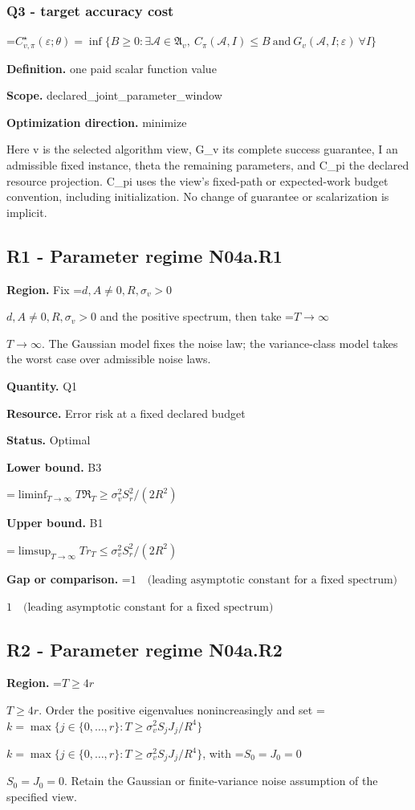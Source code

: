 \documentclass[10pt,a4paper]{article}
\newcommand{\AtlasMath}[1]{\par\begingroup\centering\setbox0=\hbox{$\displaystyle #1$}\ifdim\wd0>1.4\linewidth\typeout{ATLAS WIDE FORMULA: \the\wd0}\fi\ifdim\wd0>\linewidth\resizebox{\linewidth}{!}{\box0}\else\box0\fi\par\endgroup}
\newcommand{\AtlasInlineMath}[1]{\begingroup\setbox0=\hbox{$#1$}\ifdim\wd0>.4\linewidth\endgroup\AtlasMath{#1}\else\endgroup$#1$\fi}
\begin{document}
\subsubsection{Q3 - target accuracy cost}
\AtlasMath{C^\star_{v,\pi}(\varepsilon;\theta)=\inf\{B\ge0:\exists\mathcal A\in\mathfrak A_v,\ C_\pi(\mathcal A,I)\le B\ \text{and}\ G_v(\mathcal A,I;\varepsilon)\ \forall I\}}
\textbf{Definition.} one paid scalar function value

\textbf{Scope.} declared\_joint\_parameter\_window

\textbf{Optimization direction.} minimize

Here v is the selected algorithm view, G\_v its complete success guarantee, I an admissible fixed instance, theta the remaining parameters, and C\_pi the declared resource projection. C\_pi uses the view's fixed-path or expected-work budget convention, including initialization. No change of guarantee or scalarization is implicit.

\subsection{R1 - Parameter regime N04a.R1}
\textbf{Region.} Fix \AtlasInlineMath{d,A\ne0,R,\sigma_v>0} and the positive spectrum, then take \AtlasInlineMath{T\to\infty}. The Gaussian model fixes the noise law; the variance-class model takes the worst case over admissible noise laws.

\textbf{Quantity.} Q1

\textbf{Resource.} Error risk at a fixed declared budget

\textbf{Status.} Optimal

\textbf{Lower bound.} B3

\AtlasMath{\liminf_{T\to\infty}T\mathfrak R_T\ge\sigma_v^2S_r^2/(2R^2)}
\textbf{Upper bound.} B1

\AtlasMath{\limsup_{T\to\infty}T r_T\le\sigma_v^2S_r^2/(2R^2)}
\textbf{Gap or comparison.} \AtlasInlineMath{1\quad\text{(leading asymptotic constant for a fixed spectrum)}}

\subsection{R2 - Parameter regime N04a.R2}
\textbf{Region.} \AtlasInlineMath{T\ge4r}. Order the positive eigenvalues nonincreasingly and set \AtlasInlineMath{k=\max\{j\in\{0,\ldots,r\}:T\ge\sigma_v^2S_jJ_j/R^4\}}, with \AtlasInlineMath{S_0=J_0=0}. Retain the Gaussian or finite-variance noise assumption of the specified view.
\end{document}

